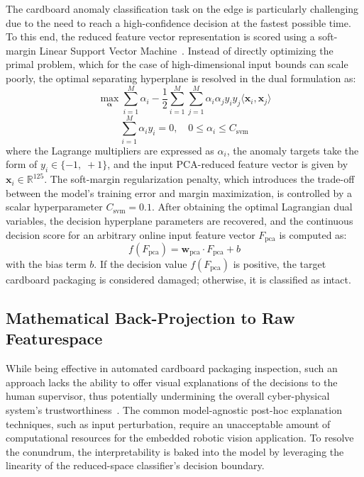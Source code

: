 The cardboard anomaly classification task on the edge is particularly challenging due to the need to reach a high-confidence decision at the fastest possible time. To this end, the reduced feature vector representation is scored using a soft-margin Linear Support Vector Machine~\cite{cortes1995support}. Instead of directly optimizing the primal problem, which for the case of high-dimensional input bounds can scale poorly, the optimal separating hyperplane is resolved in the dual formulation as:
\begin{equation}
\max_{\boldsymbol{\alpha}} \sum_{i=1}^{M} \alpha_i - \frac{1}{2} \sum_{i=1}^{M} \sum_{j=1}^{M} \alpha_i \alpha_j y_i y_j \langle \mathbf{x}_i, \mathbf{x}_j \rangle \label{eq:svm_lagrangian_dual}
\end{equation}
\begin{equation}
\sum_{i=1}^{M} \alpha_i y_i = 0, \quad 0 \le \alpha_i \le C_{\text{svm}} \label{eq:svm_constraints}
\end{equation}
where the Lagrange multipliers are expressed as $\alpha_i$, the anomaly targets take the form of $y_i \in \{-1, \; +1\}$, and the input PCA-reduced feature vector is given by $\mathbf{x}_i \in \mathbb{R}^{125}$. The soft-margin regularization penalty, which introduces the trade-off between the model's training error and margin maximization, is controlled by a scalar hyperparameter $C_{\text{svm}} = 0.1$. After obtaining the optimal Lagrangian dual variables, the decision hyperplane parameters are recovered, and the continuous decision score for an arbitrary online input feature vector $F_{\text{pca}}$ is computed as:
\begin{equation}
f(F_{\text{pca}}) = \mathbf{w}_{\text{pca}} \cdot F_{\text{pca}} + b \label{eq:svm_decision_function}
\end{equation}
with the bias term $b$. If the decision value $f(F_{\text{pca}})$ is positive, the target cardboard packaging is considered damaged; otherwise, it is classified as intact.

\subsection{Mathematical Back-Projection to Raw Featurespace}

While being effective in automated cardboard packaging inspection, such an approach lacks the ability to offer visual explanations of the decisions to the human supervisor, thus potentially undermining the overall cyber-physical system's trustworthiness~\cite{samek2017explainable}. The common model-agnostic post-hoc explanation techniques, such as input perturbation, require an unacceptable amount of computational resources for the embedded robotic vision application. To resolve the conundrum, the interpretability is baked into the model by leveraging the linearity of the reduced-space classifier's decision boundary.

